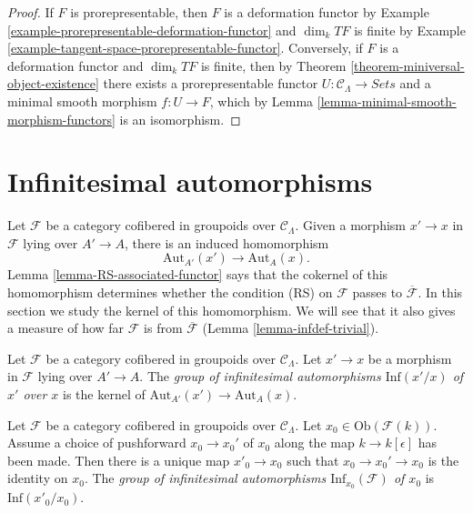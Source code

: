 \begin{proof}
If $F$ is prorepresentable, then $F$ is a deformation functor by Example 
\ref{example-prorepresentable-deformation-functor} and $\dim_k TF$ is finite by 
Example \ref{example-tangent-space-prorepresentable-functor}.  Conversely, if 
$F$ is a deformation functor and $\dim_k TF$ is finite, then by Theorem 
\ref{theorem-miniversal-object-existence} there exists a prorepresentable 
functor $U: \mathcal{C}_\Lambda \to \textit{Sets}$ and a minimal 
smooth morphism $f: U \to F$, which by Lemma 
\ref{lemma-minimal-smooth-morphism-functors} is an isomorphism.
\end{proof}




\section{Infinitesimal automorphisms}
\label{section-infinitesimal-automorphisms}

\noindent
Let $\mathcal{F}$ be a category cofibered in groupoids over $\mathcal 
C_\Lambda$. Given a morphism $x' \to x$ in $\mathcal{F}$ lying over 
$A' \to A$, there is an induced homomorphism
\[ \text{Aut}_{A'}(x') \to \text{Aut}_{A}(x). \]
Lemma \ref{lemma-RS-associated-functor} says that the cokernel of this 
homomorphism determines whether the condition (RS) on $\mathcal{F}$ passes to 
$\overline{\mathcal{F}}$. In this section we study the kernel of this 
homomorphism. We will see that it also gives a measure of how far $\mathcal{F}$ 
is from $\overline{\mathcal{F}}$ (Lemma \ref{lemma-infdef-trivial}).  

\begin{definition}
\label{definition-relative-infinitesimal-auts}
Let $\mathcal{F}$ be a category cofibered in groupoids over $\mathcal 
C_\Lambda$. Let $x' \to x$ be a morphism in $\mathcal{F}$ lying over 
$A' \to A$. The {\it group of infinitesimal automorphisms 
$\text{Inf}({x'/x})$ of $x'$ over $x$} is the kernel of 
$\text{Aut}_{A'}(x') \to \text{Aut}_{A}(x)$.
\end{definition}

\begin{definition}
\label{definition-infinitesimal-auts}
Let $\mathcal{F}$ be a category cofibered in groupoids over $\mathcal 
C_\Lambda$. Let $x_0 \in \text{Ob}(\mathcal{F}(k))$. Assume a choice of 
pushforward $x_0 \to x_0'$ of $x_0$ along the map $k \to 
k[\epsilon]$ has been made.  Then there is a unique map $x'_0 \to 
x_0$ such that $x_0 \to x_0' \to x_0$ is the identity on $x_0$. 
The {\it group of infinitesimal automorphisms $\text{Inf}_{x_0}(\mathcal 
F)$ of $x_0$} is $\text{Inf}(x'_0/x_0)$.
\end{definition}

